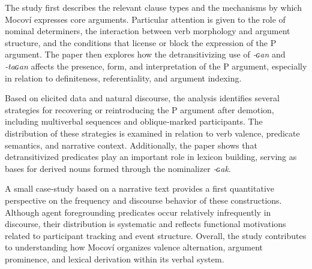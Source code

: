 \documentclass[12pt]{article}
\begin{document}
The study first describes the relevant clause types and the mechanisms by which Mocoví expresses core arguments. Particular attention is given to the role of nominal determiners, the interaction between verb morphology and argument structure, and the conditions that license or block the expression of the P argument. The paper then explores how the detransitivizing use of \textit{‑ɢan} and \textit{‑taɢan} affects the presence, form, and interpretation of the P argument, especially in relation to definiteness, referentiality, and argument indexing.

Based on elicited data and natural discourse, the analysis identifies several strategies for recovering or reintroducing the P argument after demotion, including multiverbal sequences and oblique‑marked participants. The distribution of these strategies is examined in relation to verb valence, predicate semantics, and narrative context. Additionally, the paper shows that detransitivized predicates play an important role in lexicon building, serving as bases for derived nouns formed through the nominalizer \textit{‑ɢak}.

A small case‑study based on a narrative text provides a first quantitative perspective on the frequency and discourse behavior of these constructions. Although agent foregrounding predicates occur relatively infrequently in discourse, their distribution is systematic and reflects functional motivations related to participant tracking and event structure. Overall, the study contributes to understanding how Mocoví organizes valence alternation, argument prominence, and lexical derivation within its verbal system.


\end{document}
